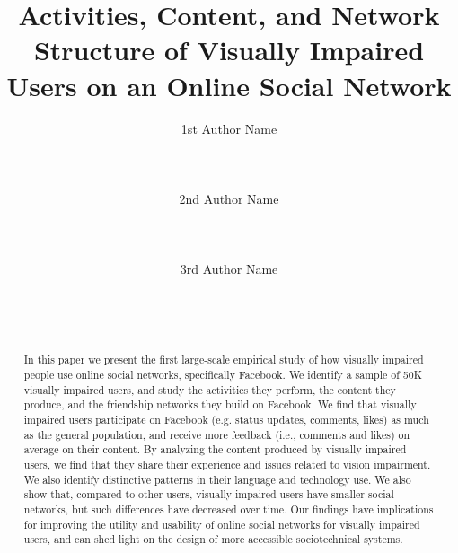 \documentclass{sigchi}
\begin{document}
\title{Activities, Content, and Network Structure of Visually Impaired Users on an Online Social Network}

\author{
  \alignauthor 1st Author Name\\
    \\
    \\
    \\
  \alignauthor 2nd Author Name\\
    \\
    \\
    \\
  \alignauthor 3rd Author Name\\
    \\
    \\
    \\
}

\maketitle

\begin{abstract}


In this paper we present the first large-scale empirical study of how visually impaired people use online social networks, specifically Facebook. We identify a sample of 50K visually impaired users, and study the activities they perform, the content they produce, and the friendship networks they build on Facebook. We find that visually impaired users participate on Facebook (e.g. status updates, comments, likes) as much as the general population, and receive more feedback (i.e., comments and likes) on average on their content. By analyzing the content produced by visually impaired users, we find that they share their experience and issues related to vision impairment. We also identify distinctive patterns in their language and technology use. We also show that, compared to other users, visually impaired users have  smaller social networks, but such differences have decreased over time. Our findings have implications for improving the utility and usability of online social networks for visually impaired users, and can shed light on the design of more accessible sociotechnical systems.




\end{abstract}
\end{document}
